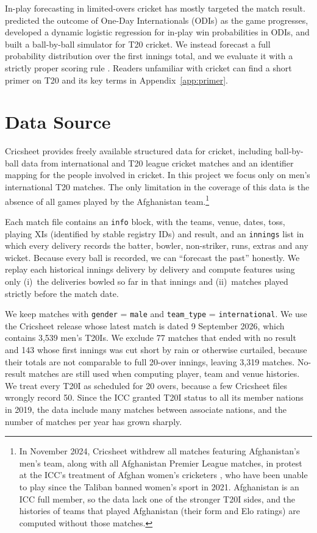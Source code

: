 \documentclass{article}
\newcommand{\1}{\mathbf{1}}
\begin{document}
In-play forecasting in limited-overs cricket has mostly targeted the match result. \citet{bailey2006} predicted the outcome of One-Day Internationals (ODIs) as the game progresses, \citet{asif2016} developed a dynamic logistic regression for in-play win probabilities in ODIs, and \citet{davis2015} built a ball-by-ball simulator for T20 cricket. We instead forecast a full probability distribution over the first innings total, and we evaluate it with a strictly proper scoring rule \citep{gneiting2007}. Readers unfamiliar with cricket can find a short primer on T20 and its key terms in Appendix~\ref{app:primer}.

\section{Data Source}\label{sec:data}
Cricsheet \citep{cricsheet} provides freely available structured data for cricket, including ball-by-ball data from international and T20 league cricket matches and an identifier mapping for the people involved in cricket. In this project we focus only on men's international T20 matches. The only limitation in the coverage of this data is the absence of all games played by the Afghanistan team.\footnote{In November 2024, Cricsheet withdrew all matches featuring Afghanistan's men's team, along with all Afghanistan Premier League matches, in protest at the ICC's treatment of Afghan women's cricketers \citep{cricsheet_afg}, who have been unable to play since the Taliban banned women's sport in 2021. Afghanistan is an ICC full member, so the data lack one of the stronger T20I sides, and the histories of teams that played Afghanistan (their form and Elo ratings) are computed without those matches.}

Each match file contains an \texttt{info} block, with the teams, venue, dates, toss, playing XIs (identified by stable registry IDs) and result, and an \texttt{innings} list in which every delivery records the batter, bowler, non-striker, runs, extras and any wicket. Because every ball is recorded, we can ``forecast the past'' honestly. We replay each historical innings delivery by delivery and compute features using only (i)~the deliveries bowled so far in that innings and (ii)~matches played strictly before the match date.

We keep matches with \texttt{gender} = \texttt{male} and \texttt{team\_type} = \texttt{international}. We use the Cricsheet release whose latest match is dated 9 September 2026, which contains 3{,}539 men's T20Is. We exclude 77 matches that ended with no result and 143 whose first innings was cut short by rain or otherwise curtailed, because their totals are not comparable to full 20-over innings, leaving 3{,}319 matches. No-result matches are still used when computing player, team and venue histories. We treat every T20I as scheduled for 20 overs, because a few Cricsheet files wrongly record 50. Since the ICC granted T20I status to all its member nations in 2019, the data include many matches between associate nations, and the number of matches per year has grown sharply.
\end{document}
